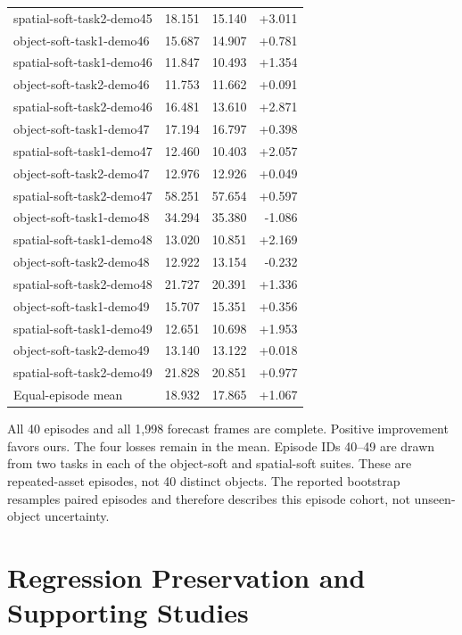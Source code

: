 \documentclass[10pt,twocolumn,letterpaper]{article}
\begin{document}
\begin{center}
\begin{tabular}{lrrr}
spatial-soft-task2-demo45 & 18.151 & 15.140 & +3.011\\
object-soft-task1-demo46 & 15.687 & 14.907 & +0.781\\
spatial-soft-task1-demo46 & 11.847 & 10.493 & +1.354\\
object-soft-task2-demo46 & 11.753 & 11.662 & +0.091\\
spatial-soft-task2-demo46 & 16.481 & 13.610 & +2.871\\
object-soft-task1-demo47 & 17.194 & 16.797 & +0.398\\
spatial-soft-task1-demo47 & 12.460 & 10.403 & +2.057\\
object-soft-task2-demo47 & 12.976 & 12.926 & +0.049\\
spatial-soft-task2-demo47 & 58.251 & 57.654 & +0.597\\
object-soft-task1-demo48 & 34.294 & 35.380 & -1.086\\
spatial-soft-task1-demo48 & 13.020 & 10.851 & +2.169\\
object-soft-task2-demo48 & 12.922 & 13.154 & -0.232\\
spatial-soft-task2-demo48 & 21.727 & 20.391 & +1.336\\
object-soft-task1-demo49 & 15.707 & 15.351 & +0.356\\
spatial-soft-task1-demo49 & 12.651 & 10.698 & +1.953\\
object-soft-task2-demo49 & 13.140 & 13.122 & +0.018\\
spatial-soft-task2-demo49 & 21.828 & 20.851 & +0.977\\
\midrule Equal-episode mean &18.932&17.865&+1.067\\\bottomrule
\end{tabular}
\end{center}
\noindent All 40 episodes and all 1,998 forecast frames are complete. Positive improvement favors ours. The four losses remain in the mean. Episode IDs 40--49 are drawn from two tasks in each of the object-soft and spatial-soft suites. These are repeated-asset episodes, not 40 distinct objects. The reported bootstrap resamples paired episodes and therefore describes this episode cohort, not unseen-object uncertainty.

\clearpage
\twocolumn
\section{Regression Preservation and Supporting Studies}
\end{document}
